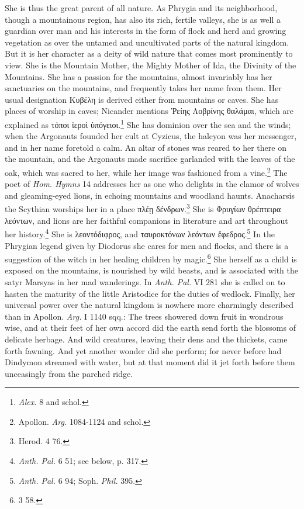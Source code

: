 \documentclass[a4paper, 11pt, oneside, polutonikogreek, english]{article}
\begin{document}
She is thus the great parent of all nature. As Phrygia and its neighborhood, though a mountainous region, has also its rich, fertile valleys, she is as well a guardian over man and his interests in the form of flock and herd and growing vegetation as over the untamed and uncultivated parts of the natural kingdom. But it is her character as a deity of wild nature that comes most prominently to view. She is the Mountain Mother, the Mighty Mother of Ida, the Divinity of the Mountains. She has a passion for the mountains, almost invariably has her sanctuaries on the mountains, and frequently takes her name from them. Her usual designation Κυβέλη is derived either from mountains or caves. She has places of worship in caves; Nicander mentions Ῥείης Λοβρίνης θαλάμαι, which are explained as τόποι ἱεροὶ ὑπόγειοι.\footnote{\emph{Alex.} 8 and schol.} She has dominion over the sea and the winds; when the Argonauts founded her cult at Cyzicus, the halcyon was her messenger, and in her name foretold a calm. An altar of stones was reared to her there on the mountain, and the Argonauts made sacrifice garlanded with the leaves of the oak, which was sacred to her, while her image was fashioned from a vine.\footnote{Apollon. \emph{Arg.} 1084-1124 and schol.} The poet of \emph{Hom. Hymns} 14 addresses her as one who delights in the clamor of wolves and gleaming-eyed lions, in echoing mountains and woodland haunts. Anacharsis the Scythian worships her in a place πλέῃ δένδρων.\footnote{Herod. 4 76.} She is Φρυγίων θρέπτειρα λεόντων, and lions are her faithful companions in literature and art throughout her history.\footnote{\emph{Anth. Pal.} 6 51; see below, p. 317.} She is λεοντόδιφρος, and ταυροκτόνων λεόντων ἔφεδρος.\footnote{\emph{Anth. Pal.} 6 94; Soph. \emph{Phil.} 395.} In the Phrygian legend given by Diodorus she cares for men and flocks, and there is a suggestion of the witch in her healing children by magic.\footnote{3 58.} She herself as a child is exposed on the mountains, is nourished by wild beasts, and is associated with the satyr Marsyas in her mad wanderings. In \emph{Anth. Pal.} VI 281 she is called on to hasten the maturity of the little Aristodice for the duties of wedlock. Finally, her universal power over the natural kingdom is nowhere more charmingly described than in Apollon. \emph{Arg.} I 1140 sqq.: The trees showered down fruit in wondrous wise, and at their feet of her own accord did the earth send forth the blossoms of delicate herbage. And wild creatures, leaving their dens and the thickets, came forth fawning. And yet another wonder did she perform; for never before had Dindymon streamed with water, but at that moment did it jet forth before them unceasingly from the parched ridge.
\end{document}
